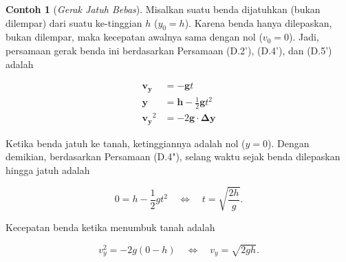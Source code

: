 \documentclass[12pt, a4paper]{article}\usepackage[utf8]{inputenc}
\theoremstyle{plain}
\theoremstyle{plain}
\numberwithin{equation}{section}
\theoremstyle{definition}
\newtheorem{contoh}[teorema]{Contoh}
\begin{document}
	
	\begin{contoh}[\emph{Gerak Jatuh Bebas}]
		Misalkan suatu benda dijatuhkan (bukan dilempar) dari suatu ke-\linebreak tinggian $h$ ($y_0 = h$). Karena benda hanya dilepaskan, bukan dilempar, maka kecepatan awalnya sama dengan nol ($v_{0} = 0$). Jadi, persamaan gerak benda ini berdasarkan Persamaan (D.2'), (D.4'), dan (D.5') adalah
		
		\vspace{-1.8em}
		\begin{align*}
			\boldsymbol{v_y} &= - \boldsymbol{g} t \tag{D.2"}\\
			\boldsymbol{y} &= \boldsymbol{h} - \frac{1}{2} \boldsymbol{g} t^2 \tag{D.4"}\\
			\boldsymbol{v_y}^2 &= - 2 \boldsymbol{g} \cdot \boldsymbol{\Delta y} \tag{D.5"}
		\end{align*}
		
		Ketika benda jatuh ke tanah, ketinggiannya adalah nol ($y = 0$). Dengan demikian, berdasarkan Persamaan (D.4"), selang waktu sejak benda dilepaskan hingga jatuh adalah
		
		\begin{equation}
			0 = h - \frac{1}{2} gt^2 \quad \Longleftrightarrow \quad t = \sqrt{\frac{2h}{g}}.
		\end{equation}
		
		Kecepatan benda ketika menumbuk tanah adalah
		
		\begin{equation}
			v_y^2 = -2g(0 - h) \quad \Longleftrightarrow \quad v_y = \sqrt{2gh}.
		\end{equation}
	\end{contoh}
	
\end{document}
